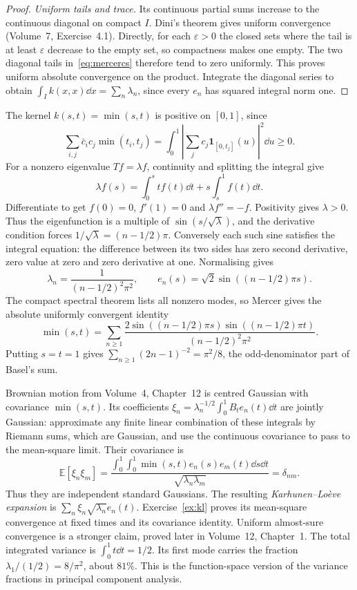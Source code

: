 \begin{proof}
\emph{Uniform tails and trace.} Its continuous partial sums increase to the continuous diagonal on compact $I$. Dini's theorem gives uniform convergence (Volume~7, Exercise~4.1). Directly, for each $\varepsilon>0$ the closed sets where the tail is at least $\varepsilon$ decrease to the empty set, so compactness makes one empty. The two diagonal tails in~\eqref{eq:mercercs} therefore tend to zero uniformly. This proves uniform absolute convergence on the product. Integrate the diagonal series to obtain $\int_Ik(x,x)\dd x=\sum_n\lambda_n$, since every $e_n$ has squared integral norm one.
\end{proof}

\begin{example}\label{ex:minkernel}
The kernel $k(s,t)=\min(s,t)$ is positive on $[0,1]$, since
\[
\sum_{i,j}\bar c_ic_j\min(t_i,t_j)
=\int_0^1\left|\sum_jc_j\mathbf1_{[0,t_j]}(u)\right|^2\dd u\ge0.
\]
For a nonzero eigenvalue $Tf=\lambda f$, continuity and splitting the integral give
\[
\lambda f(s)=\int_0^stf(t)\dd t+s\int_s^1f(t)\dd t.
\]
Differentiate to get $f(0)=0$, $f'(1)=0$ and $\lambda f''=-f$. Positivity gives $\lambda>0$. Thus the eigenfunction is a multiple of $\sin(s/\sqrt\lambda)$, and the derivative condition forces $1/\sqrt\lambda=(n-1/2)\pi$. Conversely each such sine satisfies the integral equation: the difference between its two sides has zero second derivative, zero value at zero and zero derivative at one. Normalising gives
\[
\lambda_n=\frac1{(n-1/2)^2\pi^2},\qquad
e_n(s)=\sqrt2\sin((n-1/2)\pi s).
\]
The compact spectral theorem lists all nonzero modes, so Mercer gives the absolute uniformly convergent identity
\[
\min(s,t)=\sum_{n\ge1}
\frac{2\sin((n-1/2)\pi s)\sin((n-1/2)\pi t)}{(n-1/2)^2\pi^2}.
\]
Putting $s=t=1$ gives $\sum_{n\ge1}(2n-1)^{-2}=\pi^2/8$, the odd-denominator part of Basel's sum.
\end{example}

Brownian motion from Volume~4, Chapter~12 is centred Gaussian with covariance $\min(s,t)$. Its coefficients
$\xi_n=\lambda_n^{-1/2}\int_0^1B_te_n(t)\dd t$
are jointly Gaussian: approximate any finite linear combination of these integrals by Riemann sums, which are Gaussian, and use the continuous covariance to pass to the mean-square limit. Their covariance is
\[
\mathbb E[\xi_n\xi_m]=
\frac{\int_0^1\!\int_0^1\min(s,t)e_n(s)e_m(t)\dd s\dd t}
{\sqrt{\lambda_n\lambda_m}}=\delta_{nm}.
\]
Thus they are independent standard Gaussians. The resulting \emph{Karhunen--Lo\`eve expansion} is $\sum_n\xi_n\sqrt{\lambda_n}e_n(t)$. Exercise~\ref{ex:kl} proves its mean-square convergence at fixed times and its covariance identity. Uniform almost-sure convergence is a stronger claim, proved later in Volume~12, Chapter~1.
The total integrated variance is $\int_0^1t\dd t=1/2$. Its first mode carries the fraction $\lambda_1/(1/2)=8/\pi^2$, about $81\%$. This is the function-space version of the variance fractions in principal component analysis.

